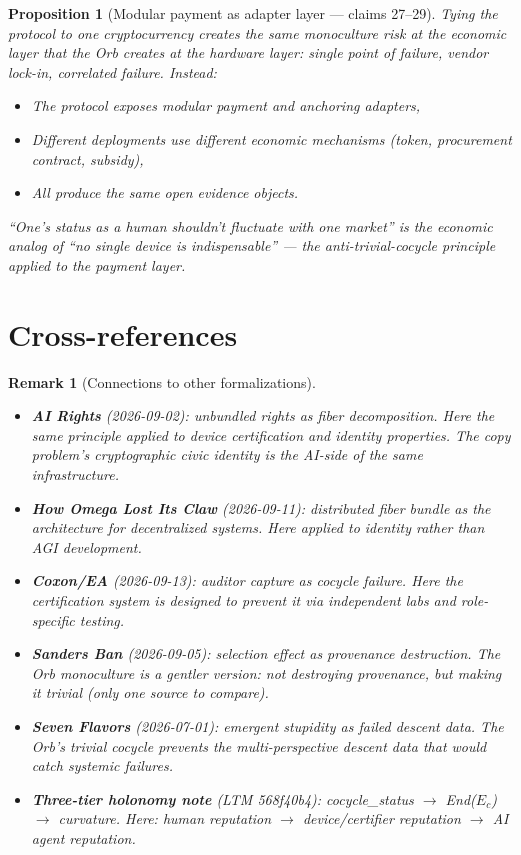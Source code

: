 \documentclass[11pt,a4paper]{article}
\newtheorem{proposition}[definition]{Proposition}
\newtheorem{remark}[definition]{Remark}
\begin{document}
\begin{proposition}[Modular payment as adapter layer --- claims 27--29]
\label{prop:payment}
Tying the protocol to one cryptocurrency creates the same monoculture
risk at the economic layer that the Orb creates at the hardware layer:
single point of failure, vendor lock-in, correlated failure. Instead:
\begin{itemize}
\item The protocol exposes modular payment and anchoring adapters,
\item Different deployments use different economic mechanisms
  (token, procurement contract, subsidy),
\item All produce the same open evidence objects.
\end{itemize}
``One's status as a human shouldn't fluctuate with one market'' is
the economic analog of ``no single device is indispensable'' ---
the anti-trivial-cocycle principle applied to the payment layer.
\end{proposition}

\section{Cross-references}

\begin{remark}[Connections to other formalizations]
\begin{itemize}
\item \textbf{AI Rights} (2026-09-02): unbundled rights as fiber
  decomposition. Here the same principle applied to device certification
  and identity properties. The copy problem's cryptographic civic identity
  is the AI-side of the same infrastructure.
\item \textbf{How Omega Lost Its Claw} (2026-09-11): distributed fiber
  bundle as the architecture for decentralized systems. Here applied to
  identity rather than AGI development.
\item \textbf{Coxon/EA} (2026-09-13): auditor capture as cocycle failure.
  Here the certification system is designed to prevent it via independent
  labs and role-specific testing.
\item \textbf{Sanders Ban} (2026-09-05): selection effect as provenance
  destruction. The Orb monoculture is a gentler version: not destroying
  provenance, but making it trivial (only one source to compare).
\item \textbf{Seven Flavors} (2026-07-01): emergent stupidity as failed
  descent data. The Orb's trivial cocycle prevents the multi-perspective
  descent data that would catch systemic failures.
\item \textbf{Three-tier holonomy note} (LTM 568f40b4): cocycle\_status
  $\to$ End($E_c$) $\to$ curvature. Here: human reputation $\to$
  device/certifier reputation $\to$ AI agent reputation.
\end{itemize}
\end{remark}
\end{document}
